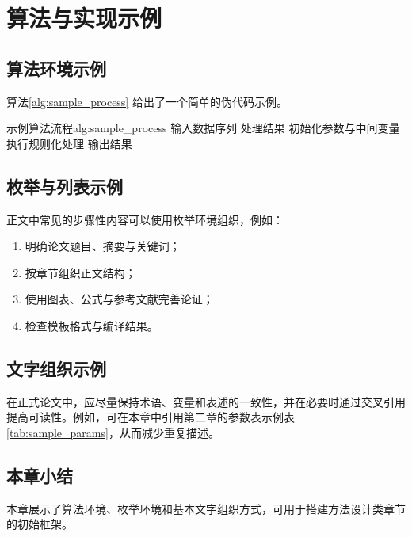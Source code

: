 \chapter{算法与实现示例}

\section{算法环境示例}

算法\ref{alg:sample_process} 给出了一个简单的伪代码示例。

\begin{buptalgorithm}{示例算法流程}{alg:sample_process}
    \Require 输入数据序列 
    \Ensure 处理结果 
    \State 初始化参数与中间变量
        \State 执行规则化处理
    \EndFor
    \State 输出结果
\end{buptalgorithm}

\section{枚举与列表示例}

正文中常见的步骤性内容可以使用枚举环境组织，例如：

\begin{enumerate}
    \item 明确论文题目、摘要与关键词；
    \item 按章节组织正文结构；
    \item 使用图表、公式与参考文献完善论证；
    \item 检查模板格式与编译结果。
\end{enumerate}

\section{文字组织示例}

在正式论文中，应尽量保持术语、变量和表述的一致性，并在必要时通过交叉引用提高可读性。例如，可在本章中引用第二章的参数表示例表\ref{tab:sample_params}，从而减少重复描述。

\section{本章小结}

本章展示了算法环境、枚举环境和基本文字组织方式，可用于搭建方法设计类章节的初始框架。
